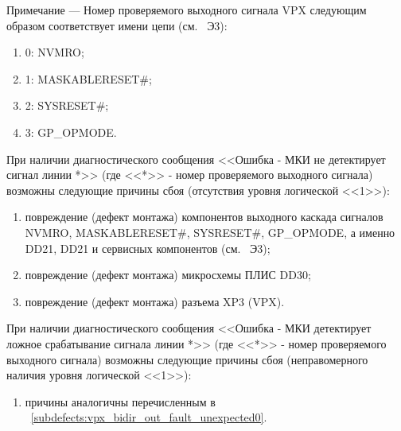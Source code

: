   \begin{sloppypar}
  
    \begin{footnotesize}    
      Примечание --- Номер проверяемого выходного сигнала VPX следующим образом соответствует имени цепи (см. \DocProductSignature~Э3):
      \begin{enumerate}
	\item 0: NVMRO;
	\item 1: MASKABLERESET\#;
	\item 2: SYSRESET\#;
	\item 3: GP\_OPMODE.
      \end{enumerate}      
    \end{footnotesize}
  
    \subpoint При наличии диагностического сообщения <<Ошибка - МКИ не детектирует сигнал линии *>>
	      (где <<*>> - номер проверяемого выходного сигнала) возможны следующие причины сбоя (отсутствия уровня логической <<1>>):
      \label{subdefects:vpx_bidir_out_fault_unexpected0}
      \begin{enumerate}
	\item повреждение (дефект монтажа) компонентов выходного каскада сигналов NVMRO, MASKABLERESET\#, SYSRESET\#, GP\_OPMODE,
	      а именно DD21, DD21 и сервисных компонентов (см. \DocProductSignature~Э3);
	\item повреждение (дефект монтажа) микросхемы ПЛИС DD30;
	\item повреждение (дефект монтажа) разъема XP3 (VPX).
      \end{enumerate}
      
    \subpoint При наличии диагностического сообщения <<Ошибка - МКИ детектирует ложное срабатывание сигнала линии *>>
	      (где <<*>> - номер проверяемого выходного сигнала) возможны следующие причины сбоя (неправомерного наличия уровня логической <<1>>):
      \begin{enumerate}
	\item причины аналогичны перечисленным в ~\ref{subdefects:vpx_bidir_out_fault_unexpected0}.
      \end{enumerate}
   
   \end{sloppypar}

